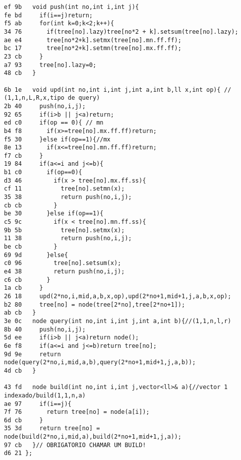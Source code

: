 \documentclass[11pt, a4paper, twoside]{article}
\begin{document}
\begin{lstlisting}
ef 9b   void push(int no,int i,int j){
fe bd     if(i==j)return;
f5 ab     for(int k=0;k<2;k++){
34 76       if(tree[no].lazy)tree[no*2 + k].setsum(tree[no].lazy);
ae e4       tree[no*2+k].setmx(tree[no].mn.ff.ff);
bc 17       tree[no*2+k].setmn(tree[no].mx.ff.ff);
23 cb     }
a7 93     tree[no].lazy=0;
48 cb   }
        
6b 1e   void upd(int no,int i,int j,int a,int b,ll x,int op){ // (1,1,n,L,R,x,tipo de query)
2b 40     push(no,i,j);
92 65     if(i>b || j<a)return;
ed c0     if(op == 0){ // mn
b4 f8       if(x>=tree[no].mx.ff.ff)return;
f5 30     }else if(op==1){//mx
8e 13       if(x<=tree[no].mn.ff.ff)return;
f7 cb     }
19 84     if(a<=i and j<=b){
b1 c0       if(op==0){
d3 46         if(x > tree[no].mx.ff.ss){
cf 11           tree[no].setmn(x);
35 38           return push(no,i,j);
cb cb         }
be 30       }else if(op==1){
c5 9c         if(x < tree[no].mn.ff.ss){
9b 5b           tree[no].setmx(x);
11 38           return push(no,i,j); 
be cb         }
69 9d       }else{
c0 96         tree[no].setsum(x);
e4 38         return push(no,i,j);
c6 cb       }
1a cb     }
26 18     upd(2*no,i,mid,a,b,x,op),upd(2*no+1,mid+1,j,a,b,x,op);
b2 80     tree[no] = node(tree[2*no],tree[2*no+1]);
ab cb   }
3e 0c   node query(int no,int i,int j,int a,int b){//(1,1,n,l,r)
8b 40     push(no,i,j);
5d ee     if(i>b || j<a)return node();
6e f8     if(a<=i and j<=b)return tree[no];
9d 9e     return node(query(2*no,i,mid,a,b),query(2*no+1,mid+1,j,a,b));
4d cb   }
      
43 fd   node build(int no,int i,int j,vector<ll>& a){//vector 1 indexado/build(1,1,n,a)
ae 97     if(i==j){
7f 76       return tree[no] = node(a[i]);
6d cb     }
35 3d     return tree[no] = node(build(2*no,i,mid,a),build(2*no+1,mid+1,j,a));
97 cb   }// OBRIGATORIO CHAMAR UM BUILD!
d6 21 };
\end{lstlisting}
\end{document}
